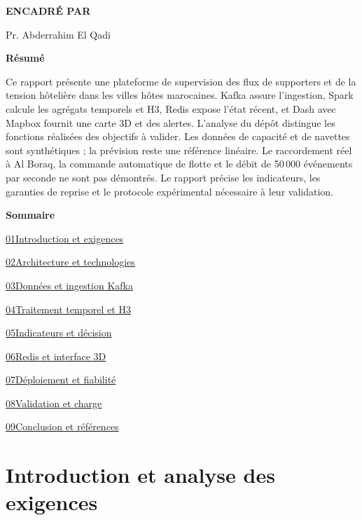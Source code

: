 \documentclass[a4paper,11pt]{article}
\newcommand{\EncadrantRapport}{Pr. Abderrahim El Qadi}
\newcommand{\tocentry}[2]{\hyperref[sec:#1]{#2}\hfill\textcolor{wine}{\pageref{sec:#1}}\par}
\begin{document}
\begin{minipage}[t]{.44\linewidth}
{\sffamily\bfseries\fontsize{8}{11}\selectfont\color{wine}ENCADRÉ PAR\par}
\vspace{2mm}
{\sffamily\fontsize{11}{15}\selectfont\color{navy}\EncadrantRapport\par}
\end{minipage}
\par\vspace{8mm}
{\sffamily\bfseries\fontsize{11}{14}\selectfont\color{navy}Résumé\par}
\vspace{1mm}
{\fontsize{10}{13}\selectfont
Ce rapport présente une plateforme de supervision des flux de supporters et de la tension hôtelière dans les villes hôtes marocaines. Kafka assure l'ingestion, Spark calcule les agrégats temporels et H3, Redis expose l'état récent, et Dash avec Mapbox fournit une carte 3D et des alertes. L'analyse du dépôt distingue les fonctions réalisées des objectifs à valider. Les données de capacité et de navettes sont synthétiques ; la prévision reste une référence linéaire. Le raccordement réel à Al Boraq, la commande automatique de flotte et le débit de 50\,000 événements par seconde ne sont pas démontrés. Le rapport précise les indicateurs, les garanties de reprise et le protocole expérimental nécessaire à leur validation.
\par}
\vspace{3mm}
{\sffamily\bfseries\fontsize{11}{14}\selectfont\color{navy}Sommaire\par}
\vspace{2mm}
\begin{minipage}[t]{.48\linewidth}
\sffamily\fontsize{8.2}{12}\selectfont\setlength{\parskip}{3pt}
\tocentry{1}{01\quad Introduction et exigences}
\tocentry{2}{02\quad Architecture et technologies}
\tocentry{3}{03\quad Données et ingestion Kafka}
\tocentry{4}{04\quad Traitement temporel et H3}
\tocentry{5}{05\quad Indicateurs et décision}
\end{minipage}\hfill
\begin{minipage}[t]{.46\linewidth}
\sffamily\fontsize{8.2}{12}\selectfont\setlength{\parskip}{3pt}
\tocentry{6}{06\quad Redis et interface 3D}
\tocentry{7}{07\quad Déploiement et fiabilité}
\tocentry{8}{08\quad Validation et charge}
\tocentry{9}{09\quad Conclusion et références}
\end{minipage}
\clearpage
\section{Introduction et analyse des exigences}\label{sec:1}
\end{document}

